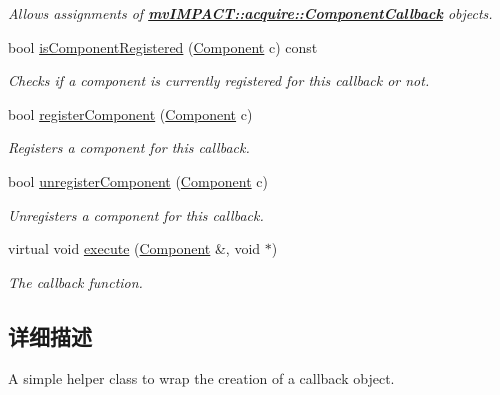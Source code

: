 \begin{DoxyCompactItemize}
\begin{DoxyCompactList}\small\item\em Allows assignments of {\bfseries \hyperlink{classmv_i_m_p_a_c_t_1_1acquire_1_1_component_callback}{mv\+I\+M\+P\+A\+C\+T\+::acquire\+::\+Component\+Callback}} objects. \end{DoxyCompactList}\item 
bool \hyperlink{classmv_i_m_p_a_c_t_1_1acquire_1_1_component_callback_a4d29b431f59c28f815655c604c4e473e}{is\+Component\+Registered} (\hyperlink{classmv_i_m_p_a_c_t_1_1acquire_1_1_component}{Component} c) const 
\begin{DoxyCompactList}\small\item\em Checks if a component is currently registered for this callback or not. \end{DoxyCompactList}\item 
bool \hyperlink{classmv_i_m_p_a_c_t_1_1acquire_1_1_component_callback_a9d6ac41d7885c16d1545fe7ceb0516dd}{register\+Component} (\hyperlink{classmv_i_m_p_a_c_t_1_1acquire_1_1_component}{Component} c)
\begin{DoxyCompactList}\small\item\em Registers a component for this callback. \end{DoxyCompactList}\item 
bool \hyperlink{classmv_i_m_p_a_c_t_1_1acquire_1_1_component_callback_a8e4afb1f424f70e9dea237fb1c5c0a3d}{unregister\+Component} (\hyperlink{classmv_i_m_p_a_c_t_1_1acquire_1_1_component}{Component} c)
\begin{DoxyCompactList}\small\item\em Unregisters a component for this callback. \end{DoxyCompactList}\item 
virtual void \hyperlink{classmv_i_m_p_a_c_t_1_1acquire_1_1_component_callback_a043e5e1faaa00a954dcb1eb9b765988d}{execute} (\hyperlink{classmv_i_m_p_a_c_t_1_1acquire_1_1_component}{Component} \&, void $\ast$)
\begin{DoxyCompactList}\small\item\em The callback function. \end{DoxyCompactList}\end{DoxyCompactItemize}


\subsection{详细描述}
A simple helper class to wrap the creation of a callback object. 

